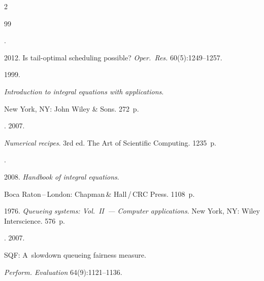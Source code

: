 \begin{multicols}{2}
{{\begin{thebibliography}{99}


.


2012. Is tail-optimal scheduling possible? \textit{Oper.\ Res.} 60(5):1249--1257.







 1999.


\textit{Introduction to integral equations with applications}.


 New York, NY: John Wiley \& Sons. 272~p.













. 2007.


\textit{Numerical recipes}. 3rd ed. The Art of Scientific Computing. 1235~p.







.


2008. \textit{Handbook of integral equations}.


 Boca Raton\,--\,London: Chapman\,\& Hall\,/\,CRC Press. 1108~p.







 1976. \textit{Queueing systems: Vol.~II~--- Computer applications}. New York, NY: Wiley Interscience. 576~p.







. 2007.


SQF: A~slowdown queueing fairness measure.


\textit{Perform. Evaluation} 64(9):1121--1136.


\end{thebibliography}





 }


 }





\end{multicols}





